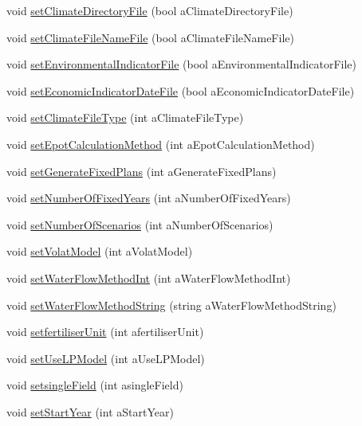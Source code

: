 \begin{DoxyCompactItemize}
\item 
void \hyperlink{classsystem_data_a86215efe1a7b9503a9f782a93cf70e03}{setClimateDirectoryFile} (bool aClimateDirectoryFile)
\item 
void \hyperlink{classsystem_data_a08909586b99e25fec61063e675605fb2}{setClimateFileNameFile} (bool aClimateFileNameFile)
\item 
void \hyperlink{classsystem_data_ad1a2ccae8bebbee4f696b67425d52ef6}{setEnvironmentalIndicatorFile} (bool aEnvironmentalIndicatorFile)
\item 
void \hyperlink{classsystem_data_a5a95933171ee2b4e62f2f28204f640a1}{setEconomicIndicatorDateFile} (bool aEconomicIndicatorDateFile)
\item 
void \hyperlink{classsystem_data_a53f418d9226592d23e73e355fcd1058a}{setClimateFileType} (int aClimateFileType)
\item 
void \hyperlink{classsystem_data_afb8e5409ccb3d2e518ccba7eec53d111}{setEpotCalculationMethod} (int aEpotCalculationMethod)
\item 
void \hyperlink{classsystem_data_ac2a39af905cb5a718c78d785bb6f1e4f}{setGenerateFixedPlans} (int aGenerateFixedPlans)
\item 
void \hyperlink{classsystem_data_a13a38b26f93adb8b51ed0d9302185f10}{setNumberOfFixedYears} (int aNumberOfFixedYears)
\item 
void \hyperlink{classsystem_data_a6c969d22bdbb856439b2e34ab91c222d}{setNumberOfScenarios} (int aNumberOfScenarios)
\item 
void \hyperlink{classsystem_data_ad9a48856bb462d674cac9f86cffa6738}{setVolatModel} (int aVolatModel)
\item 
void \hyperlink{classsystem_data_abb08133e6260060d6bb8c64581c5d813}{setWaterFlowMethodInt} (int aWaterFlowMethodInt)
\item 
void \hyperlink{classsystem_data_a95e67381901e78667cfcfe510d1c4eb7}{setWaterFlowMethodString} (string aWaterFlowMethodString)
\item 
void \hyperlink{classsystem_data_a20da87a9187447b0ecdb33dbb4176ef0}{setfertiliserUnit} (int afertiliserUnit)
\item 
void \hyperlink{classsystem_data_ac2e3bf3779ffd084cf48e59d38e0726b}{setUseLPModel} (int aUseLPModel)
\item 
void \hyperlink{classsystem_data_add68e8aad7e73a9e477330bbc9839c05}{setsingleField} (int asingleField)
\item 
void \hyperlink{classsystem_data_a49021c2a467fe79d13de7cd89231309a}{setStartYear} (int aStartYear)
\item 

\end{DoxyCompactItemize}
